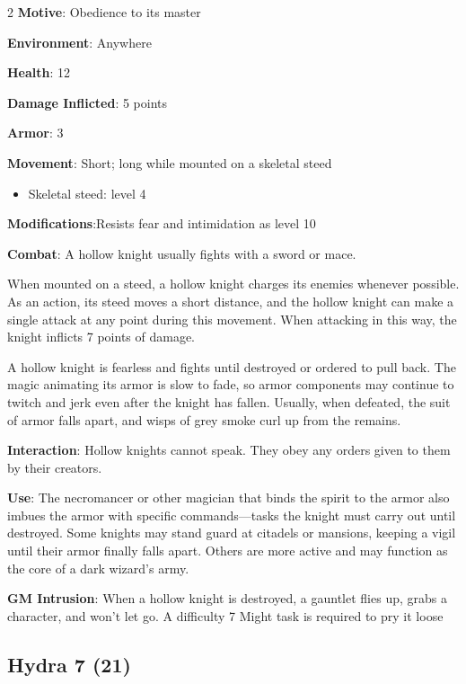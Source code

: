 \begin{multicols}{2}
\textbf{Motive}: Obedience to its master 

\textbf{Environment}: Anywhere 

\textbf{Health}: 12 

\textbf{Damage Inflicted}: 5 points 

\textbf{Armor}: 3 

\textbf{Movement}: Short; long while mounted on a skeletal steed 

\begin{itemize}
\item Skeletal steed: level 4
\end{itemize}

\textbf{Modifications}:Resists fear and intimidation as level 10 

\textbf{Combat}: A hollow knight usually fights with a sword or mace. 

When mounted on a steed, a hollow knight charges its enemies whenever possible. As an action, its steed moves a short distance, and the hollow knight can make a single attack at any point during this movement. When attacking in this way, the knight inflicts 7 points of damage. 

A hollow knight is fearless and fights until destroyed or ordered to pull back. The magic animating its armor is slow to fade, so armor components may continue to twitch and jerk even after the knight has fallen. Usually, when defeated, the suit of armor falls apart, and wisps of grey smoke curl up from the remains. 

\textbf{Interaction}: Hollow knights cannot speak. They obey any orders given to them by their creators. 

\textbf{Use}: The necromancer or other magician that binds the spirit to the armor also imbues the armor with specific commands—tasks the knight must carry out until destroyed. Some knights may stand guard at citadels or mansions, keeping a vigil until their armor finally falls apart. Others are more active and may function as the core of a dark wizard’s army.

\textbf{GM Intrusion}: When a hollow knight is destroyed, a gauntlet flies up, grabs a character, and won’t let go. A difficulty 7 Might task is required to pry it loose

\subsection{Hydra 7 (21)}


\end{multicols}

